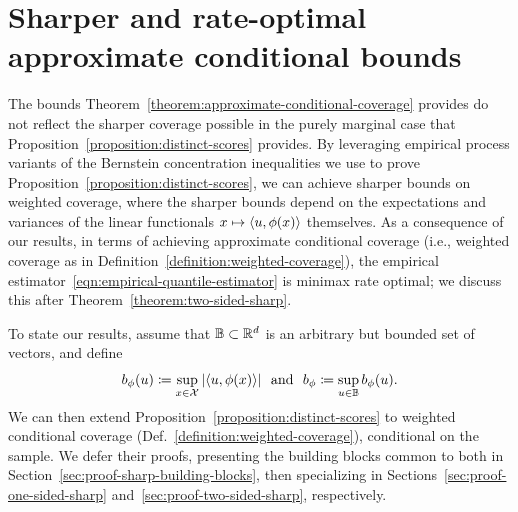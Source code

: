\documentclass[11pt]{article}
\newcommand{\radphi}{b_{\phi}}
\begin{document}
\section{Sharper and rate-optimal approximate conditional bounds}

The bounds Theorem~\ref{theorem:approximate-conditional-coverage} provides
do not reflect the sharper coverage possible in the purely marginal case
that Proposition~\ref{proposition:distinct-scores} provides.
%
By leveraging empirical process variants of the
Bernstein concentration inequalities we use to prove
Proposition~\ref{proposition:distinct-scores},
we can achieve sharper bounds on weighted coverage, where
the sharper bounds depend on the expectations and variances
of the linear functionals $x \mapsto \langle u, \phi(x)\rangle$ themselves.
%
As a consequence of our results, in terms of achieving approximate
conditional coverage (i.e., weighted coverage as in
Definition~\ref{definition:weighted-coverage}),
the empirical estimator~\eqref{eqn:empirical-quantile-estimator}
is minimax rate optimal; we discuss this
after Theorem~\ref{theorem:two-sided-sharp}.

To state our results, assume that $\mathbb{B} \subset \mathbb{R}^d$ is an arbitrary but
bounded set of vectors, and define
\begin{equation*}
  \radphi(u) \defeq \sup_{x \in \mc{X}} |\<u, \phi(x)\>|
  ~~ \mbox{and} ~~
  \radphi \defeq \sup_{u \in \ball} \radphi(u).
\end{equation*}
We can then extend Proposition~\ref{proposition:distinct-scores} to weighted
conditional coverage (Def.~\ref{definition:weighted-coverage}), conditional
on the sample.
%
We defer their proofs, presenting the building blocks
common to both in Section~\ref{sec:proof-sharp-building-blocks},
then specializing in Sections~\ref{sec:proof-one-sided-sharp}
and~\ref{sec:proof-two-sided-sharp}, respectively.
\end{document}
